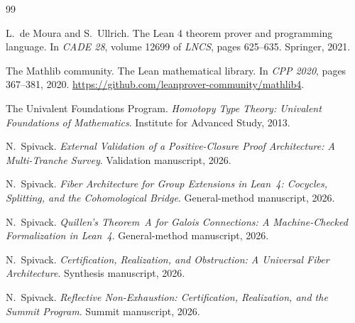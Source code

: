 \documentclass[11pt]{article}
\begin{document}

\begin{thebibliography}{99}

L.~de Moura and S.~Ullrich.
\newblock The Lean 4 theorem prover and programming language.
\newblock In \emph{CADE 28}, volume 12699 of \emph{LNCS}, pages 625--635. Springer, 2021.

The Mathlib community.
\newblock The Lean mathematical library.
\newblock In \emph{CPP 2020}, pages 367--381, 2020.
\newblock \url{https://github.com/leanprover-community/mathlib4}.

The Univalent Foundations Program.
\newblock \emph{Homotopy Type Theory: Univalent Foundations of Mathematics}.
\newblock Institute for Advanced Study, 2013.

N.~Spivack.
\newblock \emph{External Validation of a Positive-Closure Proof Architecture: A Multi-Tranche Survey}.
\newblock Validation manuscript, 2026.

N.~Spivack.
\newblock \emph{Fiber Architecture for Group Extensions in Lean~4: Cocycles, Splitting, and the Cohomological Bridge}.
\newblock General-method manuscript, 2026.

N.~Spivack.
\newblock \emph{Quillen's Theorem~A for Galois Connections: A Machine-Checked Formalization in Lean~4}.
\newblock General-method manuscript, 2026.

N.~Spivack.
\newblock \emph{Certification, Realization, and Obstruction: A Universal Fiber Architecture}.
\newblock Synthesis manuscript, 2026.

N.~Spivack.
\newblock \emph{Reflective Non-Exhaustion: Certification, Realization, and the Summit Program}.
\newblock Summit manuscript, 2026.

\end{thebibliography}
\end{document}

